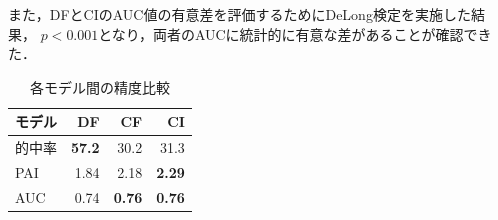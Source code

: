 また，DFとCIのAUC値の有意差を評価するためにDeLong検定\cite{DeLong}を実施した結果，
$p<0.001$となり，両者のAUCに統計的に有意な差があることが確認できた．

\begin{table}[htbp]
  \centering
  \caption{各モデル間の精度比較}
  \begin{tabular}{l|r||r|r}
  \hline

  モデル & DF & CF & CI \\  \hline\hline
  的中率 & \bf{57.2} & 30.2 & 31.3  \\ 
  PAI & 1.84 & 2.18 & \bf{2.29} \\ 
  AUC & 0.74 & \bf{0.76} & \bf{0.76} \\ \hline
  


  \end{tabular}
  \label{tb:fig:non-crime-timeseries-index}
\end{table}

\FloatBarrier